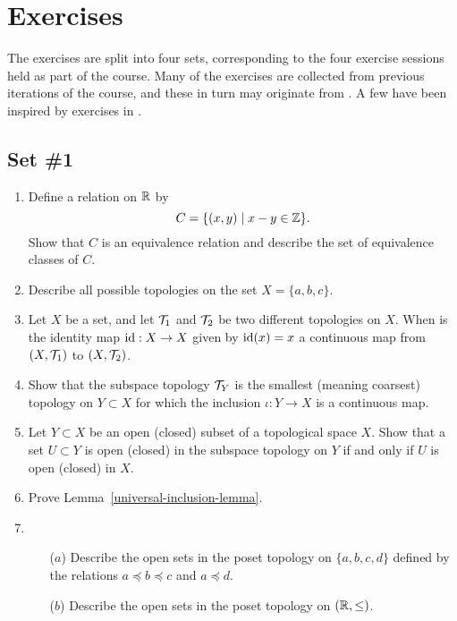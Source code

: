\section{Exercises}
The exercises are split into four sets, corresponding to the four exercise sessions held as part of the course. Many of the exercises are collected from previous iterations of the course, and these in turn may originate from \cite{Mun}. A few have been inspired by exercises in \cite{DM}.

\subsection{Set \#1}

\begin{enumerate}
  \item Define a relation on $\mathbb{R}$ by
    \[
      C=\{(x,y) \mid x - y \in \mathbb{Z} \}.
    \]
    Show that $C$ is an equivalence relation and describe the set of equivalence classes of $C$.
  \item Describe all possible topologies on the set $X = \{a,b,c\}$.
  \item Let $X$ be a set, and let $\mathcal{T}_1$ and $\mathcal{T}_2$ be two different topologies on $X$. When is the identity map $\mathrm{id} : X \to X$ given by $\mathrm{id}(x) = x$ a continuous map from $(X,\mathcal{T}_1)$ to $(X,\mathcal{T}_2)$.
  \item
		Show that the subspace topology $\mathcal{T}_Y$ is the smallest (meaning coarsest) topology on $Y\subset X$ for which the inclusion $\iota:Y \rightarrow X$ is a continuous map.
	
	\item \label{opens-in-opens} Let $Y\subset X$ be an open (closed) subset of a topological space $X$. Show that a set $U \subset Y$ is open (closed) in the subspace topology on $Y$ if and only if $U$ is open (closed) in $X$.
	
	\item \label{universal-inclusion} Prove Lemma~\ref{universal-inclusion-lemma}.
	
  \item \begin{itemize}
		\item[($a$)] Describe the open sets in the poset topology on $\{a,b,c,d\}$ defined by the relations $a\preceq b\preceq c$ and $a\preceq d$.
		\item[($b$)] Describe the open sets in the poset topology on $(\mathbb{R},\leq)$.
	\end{itemize}
	

\end{enumerate}
